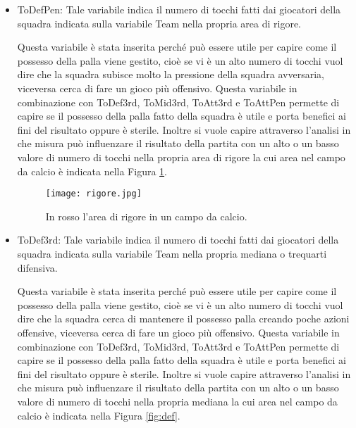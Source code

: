 \begin{itemize}
	\item \textsf{ToDefPen}: Tale variabile indica il numero di tocchi fatti dai giocatori della squadra indicata sulla variabile \textsf{Team} nella propria area di rigore. 
	
	Questa variabile è stata inserita perché può essere utile per capire come il possesso della palla viene gestito, cioè se vi è un alto numero di tocchi vuol dire che la squadra subisce molto la pressione della squadra avversaria, viceversa cerca di fare un gioco più offensivo. Questa variabile in combinazione con \textsf{ToDef3rd}, \textsf{ToMid3rd}, \textsf{ToAtt3rd} e \textsf{ToAttPen} permette di capire se il possesso della palla fatto della squadra è utile e porta benefici ai fini del risultato oppure è sterile. Inoltre si vuole capire attraverso l'analisi in che misura può influenzare il risultato della partita con un alto o un basso valore di numero di tocchi nella propria area di rigore la cui area nel campo da calcio è indicata nella Figura \ref{fig:penalty}.
	
	\begin{figure}[!ht]
		\begin{center}
			\texttt{[image: rigore.jpg]}
			\caption{In rosso l'area di rigore in un campo da calcio.}
			\label{fig:penalty}
		\end{center}
	\end{figure}
	
	
	\item \textsf{ToDef3rd}: Tale variabile indica il numero di tocchi fatti dai giocatori della squadra indicata sulla variabile \textsf{Team} nella propria mediana o trequarti difensiva. 
	
	Questa variabile è stata inserita perché può essere utile per capire come il possesso della palla viene gestito, cioè se vi è un alto numero di tocchi vuol dire che la squadra cerca di mantenere il possesso palla creando poche azioni offensive, viceversa cerca di fare un gioco più offensivo. Questa variabile in combinazione con \textsf{ToDef3rd}, \textsf{ToMid3rd}, \textsf{ToAtt3rd} e \textsf{ToAttPen} permette di capire se il possesso della palla fatto della squadra è utile e porta benefici ai fini del risultato oppure è sterile. Inoltre si vuole capire attraverso l'analisi in che misura può influenzare il risultato della partita con un alto o un basso valore di numero di tocchi nella propria mediana la cui area nel campo da calcio è indicata nella Figura \ref{fig:def}.
	

\end{itemize}
